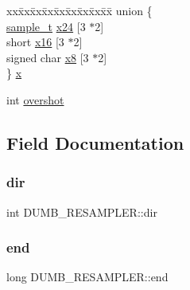 \begin{DoxyCompactItemize}
\begin{tabbing}
xx\=xx\=xx\=xx\=xx\=xx\=xx\=xx\=xx\=\kill
union \{\\
\>\hyperlink{dumb_8h_a5cb1f64159c2e6122d3f12c081ce6db8}{sample\_t} \hyperlink{struct_d_u_m_b___r_e_s_a_m_p_l_e_r_a80e6c85a2d43bfea9fa5ed2cb457683a}{x24} \mbox{[}3 $\ast$2\mbox{]}\\
\>short \hyperlink{struct_d_u_m_b___r_e_s_a_m_p_l_e_r_af30b5545dad746acfbf7aec7a857aab1}{x16} \mbox{[}3 $\ast$2\mbox{]}\\
\>signed char \hyperlink{struct_d_u_m_b___r_e_s_a_m_p_l_e_r_ace2aa215157597f46c2174a4d0378deb}{x8} \mbox{[}3 $\ast$2\mbox{]}\\
\} \hyperlink{struct_d_u_m_b___r_e_s_a_m_p_l_e_r_a39f5c1732aa6e23688a77a43553152b6}{x}\\

\end{tabbing}\item 
int \hyperlink{struct_d_u_m_b___r_e_s_a_m_p_l_e_r_aa29b7843d3156476f9d1035216edded2}{overshot}
\end{DoxyCompactItemize}


\subsection{Field Documentation}
\mbox{\label{struct_d_u_m_b___r_e_s_a_m_p_l_e_r_a51666dc358e5923700e6ce055b3869e7}} 
\subsubsection{\texorpdfstring{dir}{dir}}
{\footnotesize\ttfamily int D\+U\+M\+B\+\_\+\+R\+E\+S\+A\+M\+P\+L\+E\+R\+::dir}

\mbox{\label{struct_d_u_m_b___r_e_s_a_m_p_l_e_r_ab8e166eb7dfc8dbdbcf8e1ae036f8095}} 
\subsubsection{\texorpdfstring{end}{end}}
{\footnotesize\ttfamily long D\+U\+M\+B\+\_\+\+R\+E\+S\+A\+M\+P\+L\+E\+R\+::end}

